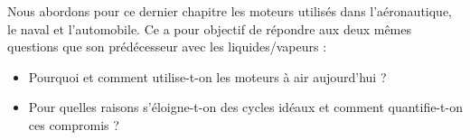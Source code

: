 Nous abordons pour ce dernier chapitre les moteurs utilisés dans l’aéronautique, le naval et l’automobile. Ce \coursdix a pour objectif de répondre aux deux mêmes questions que son prédécesseur avec les liquides/vapeurs :
\begin{itemize}
	\item Pourquoi et comment utilise-t-on les moteurs à air aujourd’hui ?
	\item Pour quelles raisons s’éloigne-t-on des cycles idéaux et comment quantifie-t-on ces compromis ?
\end{itemize}
